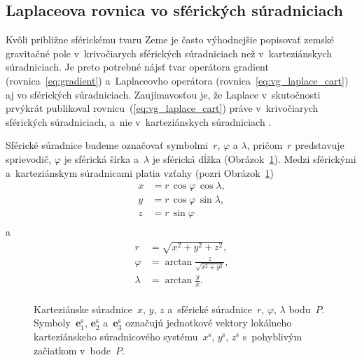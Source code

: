 \documentclass[a4paper, 12pt]{book}
\let\vec\mathbf
\begin{document}
\subsection{Laplaceova rovnica vo sférických súradniciach}
\label{sec:laplace_equation_sph}

Kvôli približne sférickému tvaru Zeme je často výhodnejšie popisovať zemské 
gravitačné pole v~krivočiarych sférických súradniciach než v~karteziánskych 
súradniciach.  Je preto potrebné nájsť tvar operátora gradient 
(rovnica~\ref{eq:gradient}) a~Laplaceovho operátora 
(rovnica~\ref{eq:vg_laplace_cart}) aj vo sférických súradniciach.  
Zaujímavosťou je, že Laplace v~skutočnosti prvýkrát publikoval 
rovnicu~(\ref{eq:vg_laplace_cart}) práve v~krivočiarych sférických 
súradniciach, a~nie v~karteziánskych súradniciach \parencite{MacMillan1930}.

Sférické súradnice budeme označovať symbolmi~$r$, $\varphi$ a $\lambda$, 
pričom~$r$ predstavuje sprievodič, $\varphi$ je sférická šírka a~$\lambda$ je 
sférická dĺžka (Obrázok~\ref{fig:cart_sph}).  Medzi sférickými a~karteziánskym 
súradnicami platia vzťahy (pozri Obrázok~\ref{fig:cart_sph})
%
\begin{equation}
\label{eq:sph2cart}
\begin{split}
x &= r \, \cos\varphi \, \cos\lambda{,}\\
y &= r \, \cos\varphi \, \sin\lambda{,}\\
z &= r \, \sin\varphi\\
\end{split}
\end{equation}
%
a
%
\begin{equation}
\label{eq:cart2sph}
\begin{split}
r &= \sqrt{x^2 + y^2 + z^2}{,}\\
\varphi &= \arctan \frac{z}{\sqrt{x^2 + y^2}}{,}\\
\lambda &= \arctan \frac{y}{x}{.}\\
\end{split}
\end{equation}

\begin{figure}
\centering

\caption{Karteziánske súradnice~$x$, $y$, $z$ a~sférické súradnice~$r$, 
$\varphi$, $\lambda$ bodu~$P$.  Symboly~$\vec{e}_1^\mathrm{s}$, 
$\vec{e}_2^\mathrm{s}$ a~$\vec{e}_3^\mathrm{s}$ označujú jednotkové vektory 
lokálneho karteziánskeho súradnicového systému~$x^\mathrm{s}$, $y^\mathrm{s}$, 
$z^\mathrm{s}$ s~pohyblivým začiatkom v~bode~$P$.}
\label{fig:cart_sph}
\end{figure}
\end{document}
